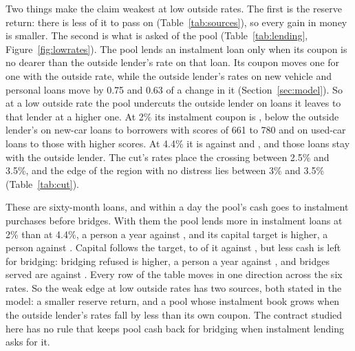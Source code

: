 Two things make the claim weakest at low outside rates. The first is the reserve return: there is less of it to
pass on (Table~\ref{tab:sources}), so every gain in money is smaller. The second is what is asked of the pool
(Table~\ref{tab:lending}, Figure~\ref{fig:lowrates}). The pool lends an instalment loan
only when its coupon is no dearer than the outside lender's rate on that loan. Its coupon moves one for one
with the outside rate, while the outside lender's rates on new vehicle and personal loans move by 0.75 and 0.63 of
a change in it (Section~\ref{sec:model}). So at a low outside rate the pool undercuts the outside lender on
loans it leaves to that lender at a higher one. At 2\% its instalment coupon is \LendCouponTwo{}, below the outside
lender's \LendNewCarTwo{} on new-car loans to borrowers with scores of 661 to 780 and \LendUsedCarTwo{} on used-car
loans to those with higher scores. At 4.4\% it is \LendCouponFourFour{} against \LendNewCarFourFour{} and
\LendUsedCarFourFour{}, and those loans stay with the outside lender. The cut's rates place the crossing
between 2.5\% and 3.5\%, and the edge of the region with no distress lies between 3\% and 3.5\%
(Table~\ref{tab:cut}).

These are sixty-month loans, and within a day the pool's cash goes to instalment purchases before
bridges. With them the pool lends \LendTermMore{} more in instalment loans at 2\% than at 4.4\%,
\LendTermTwo{} a person a year against \LendTermFourFour{}, and its capital target is \LendTargetMore{} higher,
\LendTargetTwo{} a person against \LendTargetFourFour{}. Capital follows the target, to \LendCapitalTwo{} of it
against \LendCapitalFourFour{}, but less cash is left for bridging: bridging refused is \LendRefusedMore{} higher,
\LendRefusedTwo{} a person a year against \LendRefusedFourFour{}, and bridges served are \LendServedTwo{} against
\LendServedFourFour{}. Every row of the table moves in one direction across the six
rates. So the weak edge at low outside rates has two sources, both stated in the model: a smaller reserve
return, and a pool whose instalment book grows when the outside lender's rates fall by less than its own coupon.
The contract studied here has no rule that keeps pool cash back for bridging when instalment lending asks for it.

\begin{table}[htbp]\centering\small
\resizebox{\linewidth}{!}{}
\caption{What is asked of the pool, by outside rate with no distress. The first three rows compare the pool's
instalment coupon with the outside lender's rate on the two kinds of vehicle loan for which the comparison changes
side within these rates; the pool lends such a loan when its coupon is no dearer. The other rows are medians over
the seven launch levels. Rates marked $\dagger$ are the exploratory rate cut on \CutSeeds{} seeds; the others are
the registered map on \NumSeeds{} seeds.}
\label{tab:lending}
\end{table}

